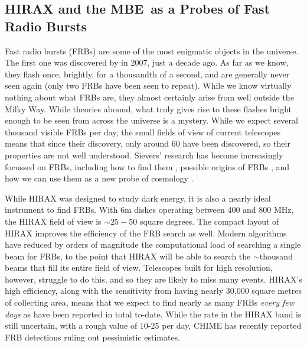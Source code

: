 \documentclass[letterpaper,11pt,preprint]{aastex}
\newcommand{\mbe}{{\rm MBE}}
\begin{document}
\subsection{HIRAX and the \mbe\ as a Probes of Fast Radio Bursts}
Fast radio bursts (FRBs) are some of the most enigmatic objects in the
universe.  The first one was discovered by \citet{Lorimer07} in 2007,
just a decade ago.  As far as we know, they flash once, brightly, for
a thousandth of a second, and are generally never seen again (only two
FRBs have been seen to repeat).  While we know virtually nothing about
what FRBs are, they almost certainly arise from well outside the Milky
Way.  While theories abound, what truly gives rise to these flashes
bright enough to be seen from across the universe is a mystery.  While
we expect several thousand visible FRBs per day, the small fields of
view of current telescopes means that since their discovery, only
around 60 have been discovered, so their properties are not well
understood. Sievers' research has become increasingly focussed on
FRBs, including how to find them \citep{Masui15}, possible origins of
FRBs \citep{Connor2016}, and how we can use them as a new probe of
cosmology \citep{Madhavacheril18}.

While HIRAX was designed to study dark energy, it is also a nearly
ideal instrument to find FRBs.  With 6m dishes operating between 400
and 800 MHz, the HIRAX field of view is $\sim 25-50$ square degrees.
The compact layout of HIRAX improves the efficiency of the FRB search
as well.  Modern algorithms have reduced by orders of magnitude the
computational load of searching a single beam for FRBs, to the point
that HIRAX will be able to search the $\sim$thousand beams that fill
its entire field of view.  Telescopes built for high resolution,
however, struggle to do this, and so they are likely to miss many
events.  HIRAX's high efficiency, along with the sensitivity from
having nearly 30,000 square metres of collecting area, means that we
expect to find nearly as many FRBs {\textit{every few days}} as have
been reported in total to-date.  While the rate in the HIRAX band is
still uncertain, with a rough value of 10-25 per day, CHIME has
recently reported FRB detections \citep{CHIME_ATEL,chime_frbs} ruling
out pessimistic estimates.
\end{document}
